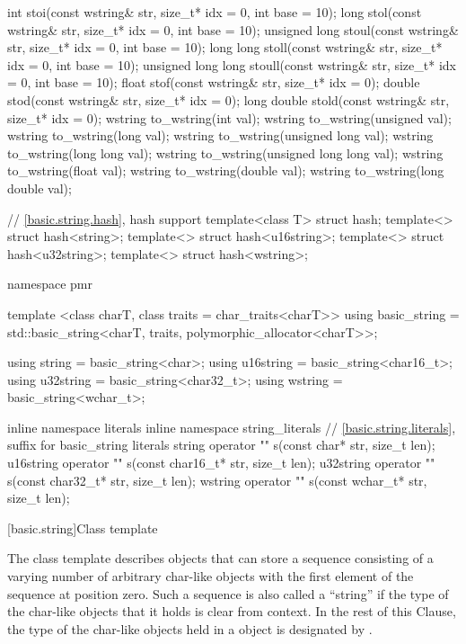 \begin{codeblock}
{  int stoi(const wstring& str, size_t* idx = 0, int base = 10);
  long stol(const wstring& str, size_t* idx = 0, int base = 10);
  unsigned long stoul(const wstring& str, size_t* idx = 0, int base = 10);
  long long stoll(const wstring& str, size_t* idx = 0, int base = 10);
  unsigned long long stoull(const wstring& str, size_t* idx = 0, int base = 10);
  float stof(const wstring& str, size_t* idx = 0);
  double stod(const wstring& str, size_t* idx = 0);
  long double stold(const wstring& str, size_t* idx = 0);
  wstring to_wstring(int val);
  wstring to_wstring(unsigned val);
  wstring to_wstring(long val);
  wstring to_wstring(unsigned long val);
  wstring to_wstring(long long val);
  wstring to_wstring(unsigned long long val);
  wstring to_wstring(float val);
  wstring to_wstring(double val);
  wstring to_wstring(long double val);

  // \ref{basic.string.hash}, hash support
  template<class T> struct hash;
  template<> struct hash<string>;
  template<> struct hash<u16string>;
  template<> struct hash<u32string>;
  template<> struct hash<wstring>;

  namespace pmr {
    template <class charT, class traits = char_traits<charT>>
      using basic_string =
        std::basic_string<charT, traits, polymorphic_allocator<charT>>;

    using string    = basic_string<char>;
    using u16string = basic_string<char16_t>;
    using u32string = basic_string<char32_t>;
    using wstring   = basic_string<wchar_t>;
  }

  inline namespace literals {
  inline namespace string_literals {
    // \ref{basic.string.literals}, suffix for basic_string literals
    string    operator "" s(const char* str, size_t len);
    u16string operator "" s(const char16_t* str, size_t len);
    u32string operator "" s(const char32_t* str, size_t len);
    wstring   operator "" s(const wchar_t* str, size_t len);
  }
  }
}
\end{codeblock}

[basic.string]{Class template }

\pnum
{}%
The
class template
describes objects that can store a sequence consisting of a varying number of
arbitrary char-like objects with the first element of the sequence at position zero.
Such a sequence is also called a ``string'' if the type of the
char-like objects that it holds
is clear from context.
In the rest of this Clause,
the type of the char-like objects held in a  object
is designated by .

